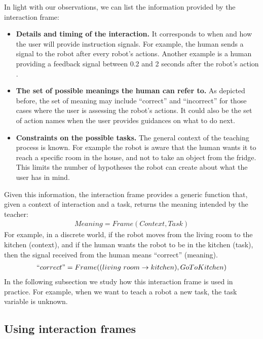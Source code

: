 In light with our observations, we can list the information provided by the interaction frame:

\begin{itemize}

\item \textbf{Details and timing of the interaction.} It corresponds to when and how the user will provide instruction signals. For example, the human sends a signal to the robot after every robot's actions. Another example is a human providing a feedback signal between 0.2 and 2 seconds after the robot's action \cite{knox2009interactively}.

\item \textbf{The set of possible meanings the human can refer to.} As depicted before, the set of meaning may include ``correct'' and ``incorrect'' for those cases where the user is assessing the robot's actions. It could also be the set of action names when the user provides guidances on what to do next.

\item \textbf{Constraints on the possible tasks.} The general context of the teaching process is known. For example the robot is aware that the human wants it to reach a specific room in the house, and not to take an object from the fridge. This limits the number of hypotheses the robot can create about what the user has in mind.

\end{itemize}

Given this information, the interaction frame provides a generic function that, given a context of interaction and a task, returns the meaning intended by the teacher:
%
\begin{eqnarray}
Meaning = Frame(Context, Task) \nonumber
\end{eqnarray}
%
For example, in a discrete world, if the robot moves from the living room to the kitchen (context), and if the human wants the robot to be in the kitchen (task), then the signal received from the human means ``correct'' (meaning). 
%
\begin{eqnarray}
``correct" = Frame((living~room \rightarrow kitchen), Go To Kitchen) \nonumber
\end{eqnarray}
%
In the following subsection we study how this interaction frame is used in practice. For example, when we want to teach a robot a new task, the task variable is unknown.

\subsection{Using interaction frames}

